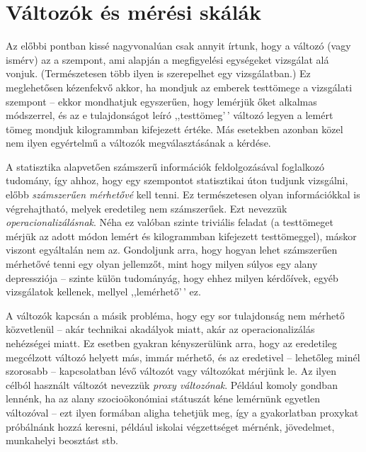 \documentclass[
]{book}
\begin{document}
\hypertarget{alapokvaltozok}{%
\section{Változók és mérési skálák}\label{alapokvaltozok}}

Az előbbi pontban kissé nagyvonalúan csak annyit írtunk, hogy a változó (vagy ismérv) az a szempont, ami alapján a megfigyelési egységeket vizsgálat alá vonjuk. (Természetesen több ilyen is szerepelhet egy vizsgálatban.) Ez meglehetősen kézenfekvő akkor, ha mondjuk az emberek testtömege a vizsgálati szempont -- ekkor mondhatjuk egyszerűen, hogy lemérjük őket alkalmas módszerrel, és az e tulajdonságot leíró ,,testtömeg'\,' változó legyen a lemért tömeg mondjuk kilogrammban kifejezett értéke. Más esetekben azonban közel nem ilyen egyértelmű a változók megválasztásának a kérdése.

A statisztika alapvetően számszerű információk feldolgozásával foglalkozó tudomány, így ahhoz, hogy egy szempontot statisztikai úton tudjunk vizsgálni, előbb \emph{számszerűen mérhetővé} kell tenni. Ez természetesen olyan információkkal is végrehajtható, melyek eredetileg nem számszerűek. Ezt nevezzük \emph{operacionalizálásnak}. Néha ez valóban szinte triviális feladat (a testtömeget mérjük az adott módon lemért és kilogrammban kifejezett testtömeggel), máskor viszont egyáltalán nem az. Gondoljunk arra, hogy hogyan lehet számszerűen mérhetővé tenni egy olyan jellemzőt, mint hogy milyen súlyos egy alany depressziója -- szinte külön tudományág, hogy ehhez milyen kérdőívek, egyéb vizsgálatok kellenek, mellyel ,,lemérhető'\,' ez.

A változók kapcsán a másik probléma, hogy egy sor tulajdonság nem mérhető közvetlenül -- akár technikai akadályok miatt, akár az operacionalizálás nehézségei miatt. Ez esetben gyakran kényszerülünk arra, hogy az eredetileg megcélzott változó helyett más, immár mérhető, és az eredetivel -- lehetőleg minél szorosabb -- kapcsolatban lévő változót vagy változókat mérjünk le. Az ilyen célból használt változót nevezzük \emph{proxy változónak}. Például komoly gondban lennénk, ha az alany szocioökonómiai státuszát kéne lemérnünk egyetlen változóval -- ezt ilyen formában aligha tehetjük meg, így a gyakorlatban proxykat próbálnánk hozzá keresni, például iskolai végzettséget mérnénk, jövedelmet, munkahelyi beosztást stb.
\end{document}
